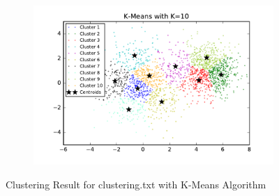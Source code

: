 \begin{description}
\begin{description}
\begin{figure}[!h]
\begin{subfigure}[b]{0.475\textwidth}
        \end{subfigure}
        \hfill
        \begin{subfigure}[b]{0.475\textwidth}   
            \centering 
            \includegraphics[width=\textwidth]{./figures/clustering_kMeans_10.pdf}
        \end{subfigure}
        
        \caption{Clustering Result for clustering.txt with K-Means Algorithm}
        \label{fig:kmean_clustering}
\end{figure}


\end{description}
\end{description}
